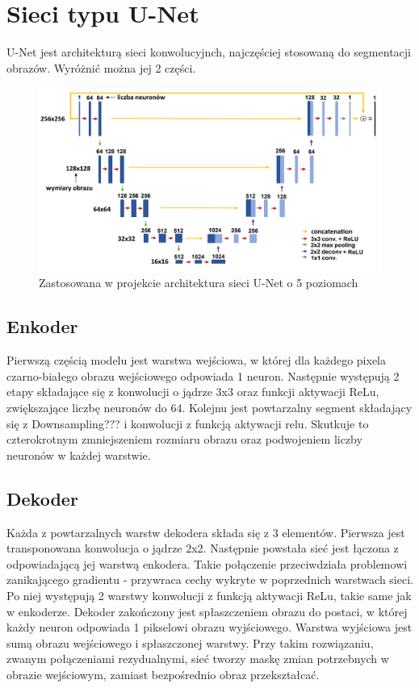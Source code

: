 \documentclass[a4paper,11pt]{article}
\begin{document}
\section{Sieci typu U-Net}
U-Net jest architekturą sieci konwolucyjnch, najczęściej stosowaną do segmentacji obrazów. Wyróżnić można jej 2 części.
\begin{figure}[h!]
	\begin{center}
	\includegraphics[width=0.9\columnwidth]{unet.png}
	\caption{Zastosowana w projekcie architektura sieci U-Net o 5 poziomach}
\end{center}
\end{figure}
\subsection{Enkoder}
Pierwszą częścią modelu jest warstwa wejściowa, w której dla każdego pixela czarno-białego obrazu wejściowego odpowiada 1 neuron.
Następnie występują 2 etapy składające się z konwolucji o jądrze 3x3 oraz funkcji aktywacji ReLu, zwiększające liczbę neuronów do 64.
Kolejnu jest powtarzalny segment składający się z Downsampling??? i konwolucji z funkcją aktywacji relu.
Skutkuje to czterokrotnym zmniejszeniem rozmiaru obrazu oraz podwojeniem liczby neuronów w każdej warstwie.
\subsection{Dekoder}
Każda z powtarzalnych warstw dekodera składa się z 3 elementów.
Pierwsza jest transponowana konwolucja o jądrze 2x2. Następnie powstała sieć jest łączona z odpowiadającą jej warstwą enkodera.
Takie połączenie przeciwdziała problemowi zanikającego gradientu - przywraca cechy wykryte w poprzednich warstwach sieci.
Po niej występują 2 warstwy konwolucji z funkcją aktywacji ReLu, takie same jak w enkoderze.
Dekoder zakończony jest spłaszczeniem obrazu do postaci, w której każdy neuron odpowiada 1 pikselowi obrazu wyjściowego.
Warstwa wyjściowa jest sumą obrazu wejściowego i spłaszczonej warstwy.
Przy takim rozwiązaniu, zwanym połączeniami rezydualnymi, sieć tworzy maskę zmian potrzebnych w obrazie wejściowym, zamiast bezpośrednio obraz przekształcać.
\end{document}
